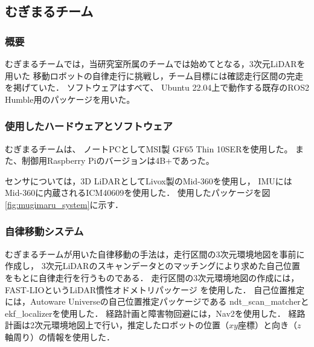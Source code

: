 \documentclass[twocolumn,9pt]{jsproceedings}
\begin{document}
\subsection{むぎまるチーム}

\subsubsection{概要}

むぎまるチームでは，当研究室所属のチームでは始めてとなる，3次元LiDARを用いた
移動ロボットの自律走行に挑戦し，チーム目標には確認走行区間の完走を掲げていた．
ソフトウェアはすべて、
Ubuntu 22.04上で動作する既存のROS2 Humble用のパッケージを用いた。

\subsubsection{使用したハードウェアとソフトウェア}

むぎまるチームは、
ノートPCとしてMSI製 GF65 Thin 10SERを使用した。
また、制御用Raspberry Piのバージョンは4B+であった。

センサについては，3D LiDARとしてLivox製のMid-360を使用し，
IMUにはMid-360に内蔵されるICM40609を使用した．
使用したパッケージを図\ref{fig:mugimaru_system}に示す．

\subsubsection{自律移動システム}

むぎまるチームが用いた自律移動の手法は，走行区間の3次元環境地図を事前に作成し，
3次元LiDARのスキャンデータとのマッチングにより求めた自己位置
をもとに自律走行を行うものである．
走行区間の3次元環境地図の作成には，FAST-LIOというLiDAR慣性オドメトリパッケージ
\cite{fastlio}を使用した．
自己位置推定には，Autoware Universeの自己位置推定パッケージである
ndt\_scan\_matcherとekf\_localizerを使用した\cite{autoware}．
経路計画と障害物回避には，Nav2を使用した\cite{nav2}．
経路計画は2次元環境地図上で行い，推定したロボットの位置（$xy$座標）と向き（$z$軸周り）の情報を使用した．
\end{document}
